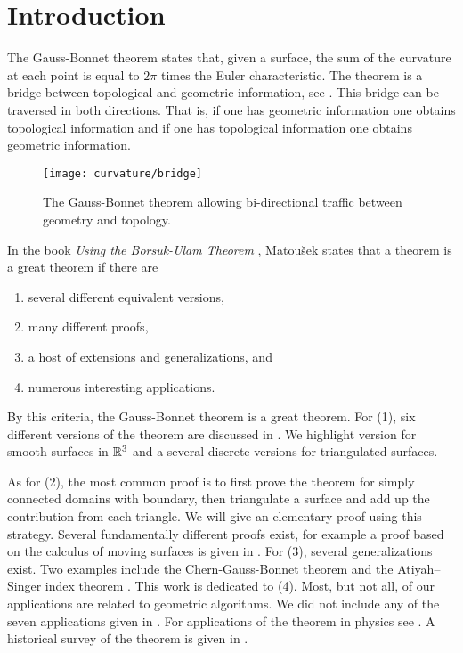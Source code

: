 \section{Introduction}
\label{sec:intro}


The Gauss-Bonnet theorem states that, given a surface, the sum of the curvature
at each point is equal to $2\pi$ times the Euler characteristic.
The theorem is a bridge between topological
and geometric information, see . 
This bridge can be traversed in both directions.
That is, if one has geometric information one obtains topological information and
if one has topological information one obtains geometric information.


\begin{figure}[htb]
\centering
\texttt{[image: curvature/bridge]}
\caption{The Gauss-Bonnet theorem allowing bi-directional traffic
between geometry and topology.}
\label{fig:bridge}
\end{figure}

In the book \emph{Using the Borsuk-Ulam Theorem}
\cite{jm08},
Matou\v{s}ek states that a theorem is a great theorem if there are
\begin{enumerate}[(1)]
\item several different equivalent versions,
\item many different proofs,
\item a host of extensions and generalizations, and
\item numerous interesting applications.
\end{enumerate}

By this criteria, the Gauss-Bonnet theorem is a great theorem.
For (1), six different versions of the theorem are discussed
in \cite{wu_historical_2008}. 
We highlight version for smooth surfaces in $\mathbb{R}^3$ and
 a several discrete versions for triangulated surfaces. 
 
As for (2), the most common proof is to first prove the theorem for simply connected domains
with boundary, then triangulate a surface and add up the contribution from each triangle.
We will give an elementary proof using this strategy.
Several fundamentally different proofs exist, for example 
a proof based on the calculus of
moving surfaces is given in \cite{grinfeld_introduction_2013}.
For (3), several generalizations exist. Two examples include
the Chern-Gauss-Bonnet theorem \cite{chern_simple_1944} and the Atiyah–Singer index 
theorem \cite{atiyah_index_1963}.
This work is dedicated to (4).
Most, but not all, of our applications are related to geometric algorithms. 
We did not include any of the seven applications given in \cite{doc76,pressley_elementary_2010}.
For applications of the
theorem in physics see \cite{tirado-physics-apps,gibbons_applications_2008}.
A historical survey of the theorem is given in \cite{wu_historical_2008}.

